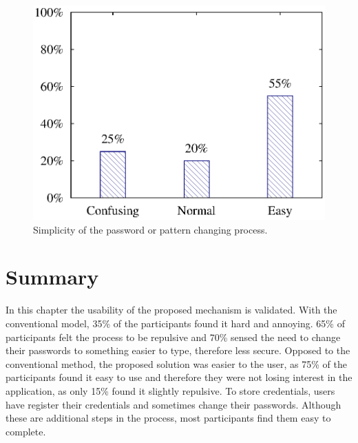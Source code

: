 \begin{figure}[H]
\centering
\includegraphics[scale=.7]{files/question10/question10.eps}
\caption{Simplicity of the password or pattern changing process.}
\label{fig:digraph}
\end{figure}

\section{Summary}
In this chapter the usability of the proposed mechanism is validated.  With the conventional model, 35\% of the participants found it hard and annoying. 65\% of participants felt the process to be repulsive and 70\% sensed the need to change their passwords to something easier to type, therefore less secure. Opposed to the conventional method, the proposed solution was easier to the user, as 75\% of the participants found it easy to use and therefore they were not losing interest in the application, as only 15\% found it slightly repulsive. To store credentials, users have register their credentials and sometimes change their passwords. Although these are additional steps in the process, most participants find them easy to complete.




